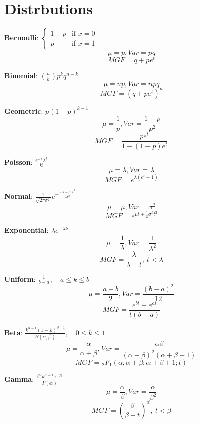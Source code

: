 \newcommand{\printdistribution}[5]{
        \textbf{#1}: $#2$
        \[\mu =  #3, Var =  #4\]\[MGF= #5\]
}
\section{Distrbutions}
\printdistribution{Bernoulli}{\begin{cases}
        1 - p & \text{if } x = 0 \\
        p & \text{if } x = 1
\end{cases}}{p}{pq}{q + pe^t}
\printdistribution{Binomial}{{n \choose k} p^k q^{n - k}}{np}{npq}{(q + pe^t)^n}
\printdistribution{Geometric}{
        p (1-p)^{k-1}
}{\frac{1}{p}}{\frac{1 - p}{p^2}}{\frac{p e^t}{1 - (1 - p) e^t}}
\printdistribution{Poisson}{
    \frac{e^{-\lambda} \lambda^{k}}{k!}
}{\lambda}{\lambda}{e^{\lambda (e^t - 1)}}
\printdistribution{Normal}{
    \frac{1}{\sqrt{2 \pi \sigma^2}} e^{ -\frac{(k - \mu)^2}{2 \sigma^2} }
}{\mu}{\sigma^2}{e^{\mu t + \frac{1}{2} \sigma^2 t^2}}
\printdistribution{Exponential}{
    \lambda e^{ -\lambda k }
}{\frac{1}{\lambda}}{\frac{1}{\lambda^2}}{\frac{\lambda}{\lambda - t}, \ t < \lambda}
\printdistribution{Uniform}{
    \frac{1}{b - a}, \quad a \leq k \leq b
}{\frac{a + b}{2}}{\frac{(b - a)^2}{12}}{\frac{e^{b t} - e^{a t}}{t (b - a)}}
\printdistribution{Beta}{
    \frac{k^{\alpha -1} (1 - k)^{\beta -1}}{B(\alpha, \beta)}, \quad 0 \leq k \leq 1
}{\frac{\alpha}{\alpha + \beta}}{\frac{\alpha \beta}{(\alpha + \beta)^2 (\alpha + \beta +1)}}{{}_2F_1(\alpha, \alpha + \beta; \alpha + \beta +1; t)}
\printdistribution{Gamma}{
    \frac{\beta^{\alpha} k^{\alpha -1} e^{-\beta k}}{\Gamma(\alpha)}
}{\frac{\alpha}{\beta}}{\frac{\alpha}{\beta^2}}{\left(\frac{\beta}{\beta - t}\right)^{\alpha}, \ t < \beta}
